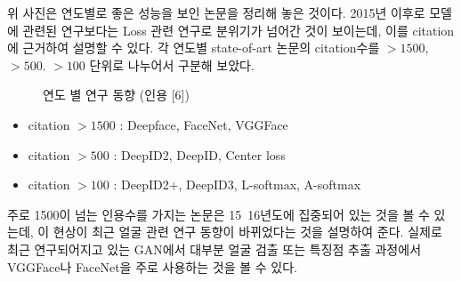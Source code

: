 위 사진은 연도별로 좋은 성능을 보인 논문을 정리해 놓은 것이다. 2015년 이후로 모델에 관련된 연구보다는 Loss 관련 연구로 분위기가 넘어간 것이 보이는데, 이를 citation에 근거하여 설명할 수 있다. 각 연도별 state-of-art 논문의 citation수를 $>1500$, $> 500$. $> 100$ 단위로 나누어서 구분해 보았다. 

\begin{figure}[h!]
\centering
\caption{연도 별 연구 동향 (인용 [6])}
\end{figure}

\begin{itemize}
\item   citation $> 1500$ : Deepface, FaceNet, VGGFace
\item   citation $> 500$  : DeepID2, DeepID, Center loss
\item   citation $> 100$  : DeepID2+, DeepID3, L-softmax, A-softmax
\end{itemize}

주로 1500이 넘는 인용수를 가지는 논문은 15~16년도에 집중되어 있는 것을 볼 수 있는데, 이 현상이 최근 얼굴 관련 연구 동향이 바뀌었다는 것을 설명하여 준다. 실제로 최근 연구되어지고 있는 GAN에서 대부분 얼굴 검출 또는 특징점 추출 과정에서 VGGFace나 FaceNet을 주로 사용하는 것을 볼 수 있다. 

